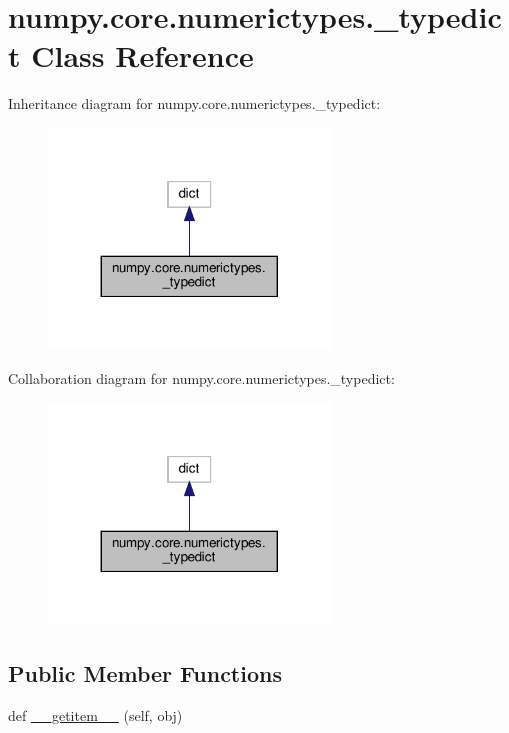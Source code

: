 \hypertarget{classnumpy_1_1core_1_1numerictypes_1_1__typedict}{}\section{numpy.\+core.\+numerictypes.\+\_\+typedict Class Reference}
\label{classnumpy_1_1core_1_1numerictypes_1_1__typedict}


Inheritance diagram for numpy.\+core.\+numerictypes.\+\_\+typedict\+:
\nopagebreak
\begin{figure}[H]
\begin{center}
\leavevmode
\includegraphics[width=212pt]{classnumpy_1_1core_1_1numerictypes_1_1__typedict__inherit__graph}
\end{center}
\end{figure}


Collaboration diagram for numpy.\+core.\+numerictypes.\+\_\+typedict\+:
\nopagebreak
\begin{figure}[H]
\begin{center}
\leavevmode
\includegraphics[width=212pt]{classnumpy_1_1core_1_1numerictypes_1_1__typedict__coll__graph}
\end{center}
\end{figure}
\subsection*{Public Member Functions}
\begin{DoxyCompactItemize}
\item 
def \hyperlink{classnumpy_1_1core_1_1numerictypes_1_1__typedict_adfd8d12b1f7b5d765e10ba860d248905}{\+\_\+\+\_\+getitem\+\_\+\+\_\+} (self, obj)
\end{DoxyCompactItemize}


